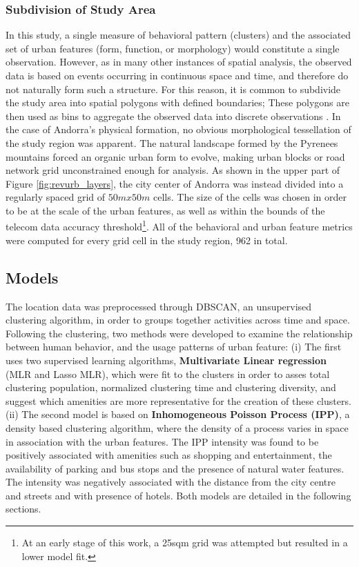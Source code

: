 \subsubsection{Subdivision of Study Area}
{
    In this study, a single measure of behavioral pattern (clusters) and the associated set of urban features (form, function, or morphology) would constitute a single observation. However, as in many other instances of spatial analysis, the observed data is based on events occurring in continuous space and time, and therefore do not naturally form such a structure. For this reason, it is common to subdivide the study area into spatial polygons with defined boundaries; These polygons are then used as bins to aggregate the observed data into discrete observations \cite{bivand2008applied}.
    \newline
    In the case of Andorra's physical formation, no obvious morphological tessellation of the study region was apparent. The natural landscape formed by the Pyrenees mountains forced an organic urban form to evolve, making urban blocks or road network grid unconstrained enough for analysis. As shown in the upper part of Figure \eqref{fig:revurb_layers}, the city center of Andorra was instead divided into a regularly spaced grid of $50mx50m$ cells. The size of the cells was chosen in order to be at the scale of the urban features, as well as within the bounds of the telecom data accuracy threshold\footnote{At an early stage of this work, a 25sqm grid was attempted but resulted in a lower model fit.}. All of the behavioral and urban feature metrics were computed for every grid cell in the study region, 962 in total.
}

\subsection{Models}
{

    The location data was preprocessed through DBSCAN, an unsupervised clustering algorithm, in order to groups together activities across time and space. Following the clustering, two methods were developed to examine the relationship between human behavior, and the usage patterns of urban feature:
    \newline
    (i) The first uses two supervised learning algorithms, \textbf{Multivariate Linear regression} (MLR and Lasso MLR), which were fit to the clusters in order to asses total clustering population, normalized clustering time and clustering diversity, and suggest which amenities are more representative for the creation of these clusters.
    \newline
    (ii) The second model is based on \textbf{Inhomogeneous Poisson Process (IPP)}, a density based clustering algorithm, where the density of a process varies in space in association with the urban features. The IPP intensity was found to be positively associated with amenities such as shopping and entertainment, the availability of parking and bus stops and the presence of natural water features. The intensity was negatively associated with the distance from the city centre and streets and with presence of hotels.
    \newline
    Both models are detailed in the following sections.
}

